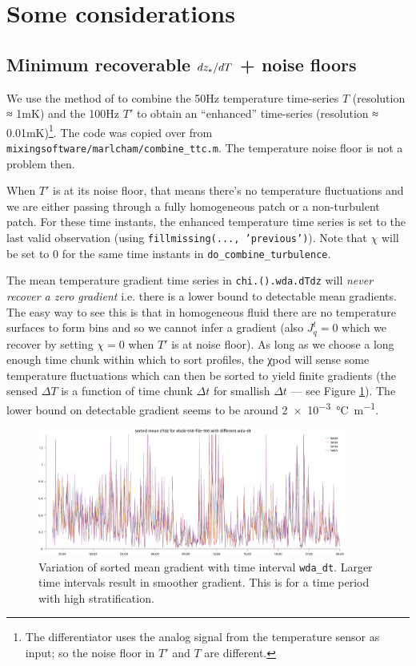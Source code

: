 \section{Some considerations}

\subsection{Minimum recoverable $dz_{*}/dT$ + noise floors}

We use the method of \cite{Mudge1994} to combine the 50Hz temperature time-series $T$ (resolution ≈ 1mK) and the 100Hz $T'$ to obtain an ``enhanced'' time-series (resolution ≈ 0.01mK)\footnote{The differentiator uses the analog signal from the temperature sensor as input; so the noise floor in $T'$ and $T$ are different.}.
The code was copied over from \texttt{mixingsoftware/marlcham/combine\_ttc.m}.
The temperature noise floor is not a problem then.

When $T'$ is at its noise floor, that means there's no temperature fluctuations and we are either passing through a fully homogeneous patch or a non-turbulent patch.
For these time instants, the enhanced temperature time series is set to the last valid observation (using \texttt{fillmissing(..., 'previous')}).
Note that $χ$ will be set to 0 for the same time instants in \texttt{do\_combine\_turbulence}.

The mean temperature gradient time series in \texttt{chi.().wda.dTdz} will \emph{never recover a zero gradient} i.e. there is a lower bound to detectable mean gradients.
The easy way to see this is that in homogeneous fluid there are no temperature surfaces to form bins and so we cannot infer a gradient (also $J_q^t = 0$ which we recover by setting $χ=0$ when $T'$ is at noise floor).
As long as we choose a long enough time chunk within which to sort profiles, the χpod will sense some temperature fluctuations which can then be sorted to yield finite gradients (the sensed $ΔT$ is a function of time chunk $Δt$ for smallish $Δt$ --- see Figure \ref{fig:dTdz-dt}).
The lower bound on detectable gradient seems to be around \SI{2e-3}{\celsius\per\metre}.

\begin{figure}
  \centering
  \includegraphics[width=0.9\textwidth]{figs/wda-sorted-dTdz-dt-variation.png}
  \caption{Variation of sorted mean gradient with time interval \texttt{wda\_dt}. Larger time intervals result in smoother gradient. This is for a time period with high stratification.}
  \label{fig:dTdz-dt}
\end{figure}

